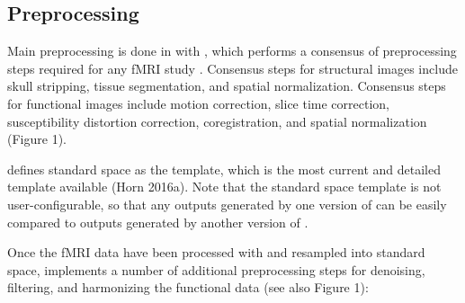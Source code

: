 \subsection{Preprocessing}\label{sec:preprocessing}

Main preprocessing is done in  with , which performs a consensus of preprocessing steps required for any fMRI study \parencite{esteban2019a}. Consensus steps for structural images include skull stripping, tissue segmentation, and spatial normalization. Consensus steps for functional images include motion correction, slice time correction, susceptibility distortion correction, coregistration, and spatial normalization (Figure 1).

 defines standard space as the  template, which is the most current and detailed template available (Horn 2016a). Note that the standard space template is not user-configurable, so that any outputs generated by one version of  can be easily compared to outputs generated by another version of .

Once the fMRI data have been processed with  and resampled into standard space,  implements a number of additional preprocessing steps for denoising, filtering, and harmonizing the functional data (see also Figure 1):

